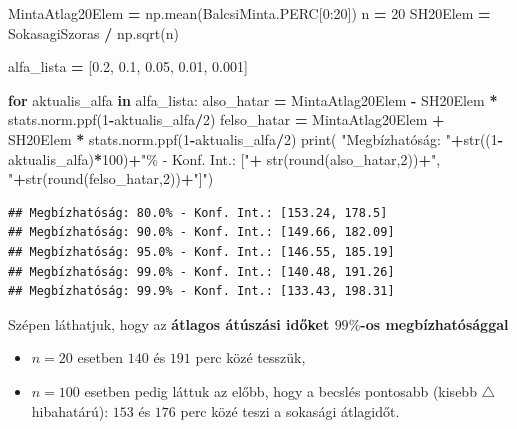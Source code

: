 \documentclass[
]{book}
\newenvironment{Shaded}{\begin{snugshade}}{\end{snugshade}}
\newcommand{\BuiltInTok}[1]{#1}
\newcommand{\ControlFlowTok}[1]{\textcolor[rgb]{0.13,0.29,0.53}{\textbf{#1}}}
\newcommand{\DecValTok}[1]{\textcolor[rgb]{0.00,0.00,0.81}{#1}}
\newcommand{\FloatTok}[1]{\textcolor[rgb]{0.00,0.00,0.81}{#1}}
\newcommand{\KeywordTok}[1]{\textcolor[rgb]{0.13,0.29,0.53}{\textbf{#1}}}
\newcommand{\NormalTok}[1]{#1}
\newcommand{\OperatorTok}[1]{\textcolor[rgb]{0.81,0.36,0.00}{\textbf{#1}}}
\newcommand{\StringTok}[1]{\textcolor[rgb]{0.31,0.60,0.02}{#1}}
\providecommand{\tightlist}{%
  \setlength{\itemsep}{0pt}\setlength{\parskip}{0pt}}
\begin{document}
\begin{Shaded}
\begin{Highlighting}[]
\NormalTok{MintaAtlag20Elem }\OperatorTok{=}\NormalTok{ np.mean(BalcsiMinta.PERC[}\DecValTok{0}\NormalTok{:}\DecValTok{20}\NormalTok{])}
\NormalTok{n }\OperatorTok{=} \DecValTok{20}
\NormalTok{SH20Elem }\OperatorTok{=}\NormalTok{ SokasagiSzoras }\OperatorTok{/}\NormalTok{ np.sqrt(n)}

\NormalTok{alfa\_lista }\OperatorTok{=}\NormalTok{ [}\FloatTok{0.2}\NormalTok{, }\FloatTok{0.1}\NormalTok{, }\FloatTok{0.05}\NormalTok{, }\FloatTok{0.01}\NormalTok{, }\FloatTok{0.001}\NormalTok{]}

\ControlFlowTok{for}\NormalTok{ aktualis\_alfa }\KeywordTok{in}\NormalTok{ alfa\_lista:}
\NormalTok{  also\_hatar }\OperatorTok{=}\NormalTok{ MintaAtlag20Elem }\OperatorTok{{-}}\NormalTok{ SH20Elem }\OperatorTok{*}\NormalTok{ stats.norm.ppf(}\DecValTok{1}\OperatorTok{{-}}\NormalTok{aktualis\_alfa}\OperatorTok{/}\DecValTok{2}\NormalTok{)}
\NormalTok{  felso\_hatar }\OperatorTok{=}\NormalTok{ MintaAtlag20Elem }\OperatorTok{+}\NormalTok{ SH20Elem }\OperatorTok{*}\NormalTok{ stats.norm.ppf(}\DecValTok{1}\OperatorTok{{-}}\NormalTok{aktualis\_alfa}\OperatorTok{/}\DecValTok{2}\NormalTok{)}
  \BuiltInTok{print}\NormalTok{(}
    \StringTok{"Megbízhatóság: "}\OperatorTok{+}\BuiltInTok{str}\NormalTok{((}\DecValTok{1}\OperatorTok{{-}}\NormalTok{aktualis\_alfa)}\OperatorTok{*}\DecValTok{100}\NormalTok{)}\OperatorTok{+}\StringTok{"\% {-} Konf. Int.: ["}\OperatorTok{+}
    \BuiltInTok{str}\NormalTok{(}\BuiltInTok{round}\NormalTok{(also\_hatar,}\DecValTok{2}\NormalTok{))}\OperatorTok{+}\StringTok{", "}\OperatorTok{+}\BuiltInTok{str}\NormalTok{(}\BuiltInTok{round}\NormalTok{(felso\_hatar,}\DecValTok{2}\NormalTok{))}\OperatorTok{+}\StringTok{"]"}\NormalTok{)}
\end{Highlighting}
\end{Shaded}

\begin{verbatim}
## Megbízhatóság: 80.0% - Konf. Int.: [153.24, 178.5]
## Megbízhatóság: 90.0% - Konf. Int.: [149.66, 182.09]
## Megbízhatóság: 95.0% - Konf. Int.: [146.55, 185.19]
## Megbízhatóság: 99.0% - Konf. Int.: [140.48, 191.26]
## Megbízhatóság: 99.9% - Konf. Int.: [133.43, 198.31]
\end{verbatim}

Szépen láthatjuk, hogy az \textbf{átlagos átúszási időket \(99\%\)-os megbízhatósággal}

\begin{itemize}
\tightlist
\item
  \(n=20\) esetben \(140\) és \(191\) perc közé tesszük,
\item
  \(n=100\) esetben pedig láttuk az előbb, hogy a becslés pontosabb (kisebb \(\triangle\) hibahatárú): \(153\) és \(176\) perc közé teszi a sokasági átlagidőt.
\end{itemize}
\end{document}
